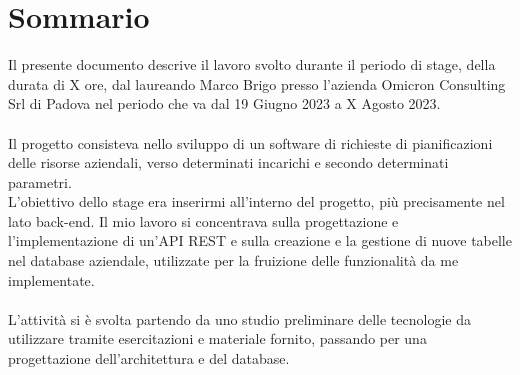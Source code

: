 \cleardoublepage
{}
{}
\begingroup
\let\clearpage\relax
\let\cleardoublepage\relax
\let\cleardoublepage\relax

\chapter*{Sommario}

Il presente documento descrive il lavoro svolto durante il periodo di stage, della durata di X ore, dal laureando Marco Brigo presso l’azienda Omicron Consulting Srl di Padova nel periodo che va dal 19 Giugno 2023 a X Agosto 2023.\\\\
Il progetto consisteva nello sviluppo di un software di richieste di pianificazioni delle risorse aziendali, verso determinati incarichi e secondo determinati parametri.\\ L’obiettivo dello stage era inserirmi all’interno del progetto, più precisamente nel lato back-end.
Il mio lavoro si concentrava sulla progettazione e l'implementazione di un'API REST e sulla creazione e la gestione di nuove tabelle nel database aziendale, utilizzate per la fruizione delle funzionalità da me implementate. 
\\\\L’attività si è svolta partendo da uno studio preliminare delle tecnologie da utilizzare tramite esercitazioni e materiale fornito, passando per una progettazione dell’architettura e del database.





\endgroup

\vfill
